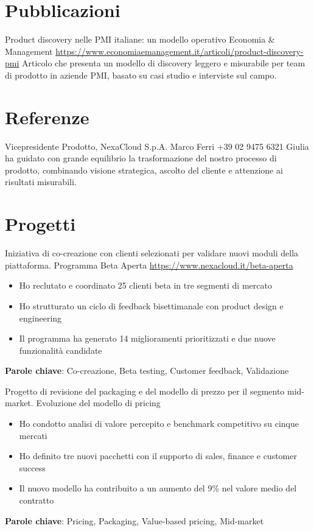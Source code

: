 \documentclass[a4paper, serif, 10pt]{moderncv}
\begin{document}
\section{Pubblicazioni}

        {Product discovery nelle PMI italiane: un modello operativo}
        {Economia \& Management}
        {\url{https://www.economiaemanagement.it/articoli/product-discovery-pmi}}
        {}
        {Articolo che presenta un modello di discovery leggero e misurabile per team di prodotto in aziende PMI, basato su casi studio e interviste sul campo.}
\section{Referenze}

        {Vicepresidente Prodotto, NexaCloud S.p.A.}
        {Marco Ferri}
        {+39 02 9475 6321}
        {}
        {Giulia ha guidato con grande equilibrio la trasformazione del nostro processo di prodotto, combinando visione strategica, ascolto del cliente e attenzione ai risultati misurabili.}
\section{Progetti}

        {Iniziativa di co-creazione con clienti selezionati per validare nuovi moduli della piattaforma.}
        {Programma Beta Aperta}
        {\url{https://www.nexacloud.it/beta-aperta}}
        {}
        {\begin{itemize}
\item Ho reclutato e coordinato 25 clienti beta in tre segmenti di mercato
\item Ho strutturato un ciclo di feedback bisettimanale con product design e engineering
\item Il programma ha generato 14 miglioramenti prioritizzati e due nuove funzionalità candidate
\end{itemize}
\textbf{Parole chiave}: Co-creazione, Beta testing, Customer feedback, Validazione}

        {Progetto di revisione del packaging e del modello di prezzo per il segmento mid-market.}
        {Evoluzione del modello di pricing}
        {}
        {}
        {\begin{itemize}
\item Ho condotto analisi di valore percepito e benchmark competitivo su cinque mercati
\item Ho definito tre nuovi pacchetti con il supporto di sales, finance e customer success
\item Il nuovo modello ha contribuito a un aumento del 9\% nel valore medio del contratto
\end{itemize}
\textbf{Parole chiave}: Pricing, Packaging, Value-based pricing, Mid-market}
\end{document}
